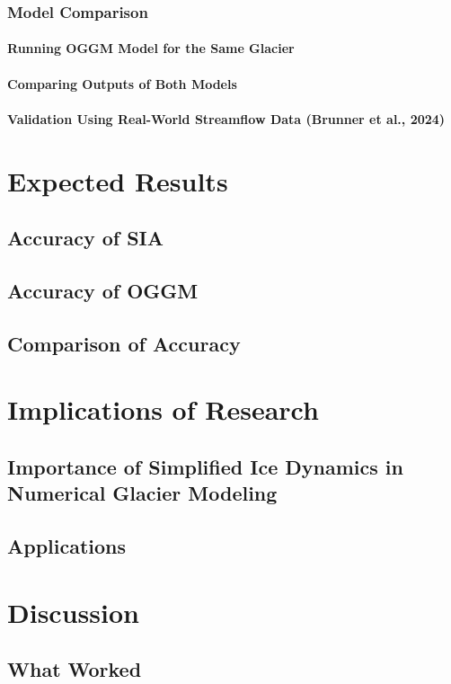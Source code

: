 \documentclass{article}
\begin{document}
\subsubsection{Model Comparison}
\paragraph{Running OGGM Model for the Same Glacier}
\paragraph{Comparing Outputs of Both Models}
\paragraph{Validation Using Real-World Streamflow Data (Brunner et al., 2024)}

\section{Expected Results}
\subsection{Accuracy of SIA}
\subsection{Accuracy of OGGM}
\subsection{Comparison of Accuracy}

\section{Implications of Research}
\subsection{Importance of Simplified Ice Dynamics in Numerical Glacier Modeling}
\subsection{Applications}

\section{Discussion}
\subsection{What Worked}
\end{document}
